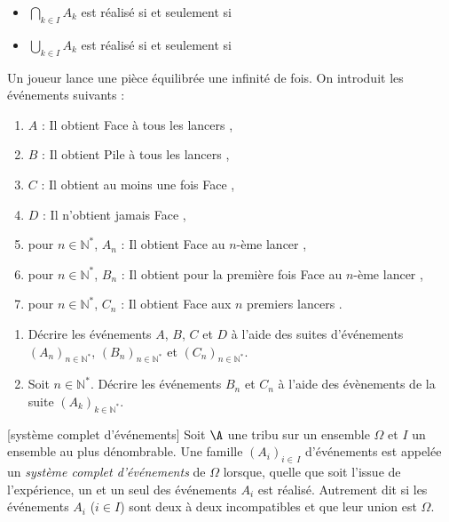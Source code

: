 \documentclass[a4paper,10pt]{report}
\begin{document}
\begin{enumerate}
\vspace{0.2cm}

\begin{itemize}
  \item $\bigcap\limits_{k\in I} A_k$ est réalisé si et seulement si 
  \item  $\bigcup\limits_{k\in I} A_k$ est réalisé si et seulement si 
\end{itemize}

\medskip

\begin{Exemple} Un joueur lance  une pièce équilibrée une infinité de fois. On introduit les événements suivants :
\begin{enumerate}
\item[\tri] $A$ : \og Il obtient Face à tous les lancers \fg,
\item[\tri] $B$ : \og Il obtient Pile à tous les lancers \fg,
\item[\tri] $C$ : \og Il obtient au moins une fois Face \fg,
\item[\tri] $D$ : \og Il n'obtient jamais Face \fg,
\item[\tri] pour $n \in \mathbb{N}^*$, $A_n$ : \og Il obtient Face au $n$-ème lancer \fg,
\item[\tri] pour $n \in \mathbb{N}^*$, $B_n$ : \og Il obtient pour la première fois Face au $n$-ème lancer \fg,
\item[\tri] pour $n \in \mathbb{N}^*$, $C_n$ : \og Il obtient Face aux $n$ premiers lancers \fg.
\end{enumerate}
\begin{enumerate}
\item Décrire les événements $A$, $B$, $C$ et $D$ à l'aide des suites d'événements $(A_n)_{n \in \mathbb{N}^*}$, $(B_n)_{n \in \mathbb{N}^*}$ et $(C_n)_{n \in \mathbb{N}^*}$.

\vspace{3cm}
\item Soit $n \in \mathbb{N}^*$. Décrire les événements $B_n$ et $C_n$ à l'aide des évènements de la suite $(A_k)_{k \in \mathbb{N}^*}$.

\vspace{3cm}
\end{enumerate}
\end{Exemple}



\begin{Definition}{}[système complet d'événements]
Soit $\A$ une tribu sur un ensemble $\Omega$ et $I$ un ensemble au plus dénombrable.
Une famille $(A_i)_{i\in\, I}$ {d'événements} est appelée un \emph{système complet d'événements} de $\Omega$ lorsque, quelle que soit l'issue de l'expérience, un et un seul des événements $A_i$ est réalisé. Autrement dit si les événements $A_i$ ($i \in I$) sont deux à deux incompatibles et que leur union est $\Omega$.
\end{Definition}


\end{enumerate}
\end{document}
